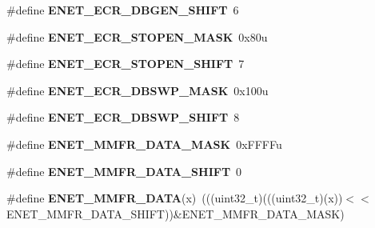 \begin{DoxyCompactItemize}
\item 
\#define {\bfseries E\+N\+E\+T\+\_\+\+E\+C\+R\+\_\+\+D\+B\+G\+E\+N\+\_\+\+S\+H\+I\+FT}~6\hypertarget{group__ENET__Register__Masks_gaf285ad3a1ec1a22c29463f3c5ce55629}{}\label{group__ENET__Register__Masks_gaf285ad3a1ec1a22c29463f3c5ce55629}

\item 
\#define {\bfseries E\+N\+E\+T\+\_\+\+E\+C\+R\+\_\+\+S\+T\+O\+P\+E\+N\+\_\+\+M\+A\+SK}~0x80u\hypertarget{group__ENET__Register__Masks_ga94a800b28e1ec6fbf2e6a237abe50dc6}{}\label{group__ENET__Register__Masks_ga94a800b28e1ec6fbf2e6a237abe50dc6}

\item 
\#define {\bfseries E\+N\+E\+T\+\_\+\+E\+C\+R\+\_\+\+S\+T\+O\+P\+E\+N\+\_\+\+S\+H\+I\+FT}~7\hypertarget{group__ENET__Register__Masks_ga265342bcbd0f282f5fbd894bb7e5191c}{}\label{group__ENET__Register__Masks_ga265342bcbd0f282f5fbd894bb7e5191c}

\item 
\#define {\bfseries E\+N\+E\+T\+\_\+\+E\+C\+R\+\_\+\+D\+B\+S\+W\+P\+\_\+\+M\+A\+SK}~0x100u\hypertarget{group__ENET__Register__Masks_ga1fccd5e705835e6e4232a4a73d66d151}{}\label{group__ENET__Register__Masks_ga1fccd5e705835e6e4232a4a73d66d151}

\item 
\#define {\bfseries E\+N\+E\+T\+\_\+\+E\+C\+R\+\_\+\+D\+B\+S\+W\+P\+\_\+\+S\+H\+I\+FT}~8\hypertarget{group__ENET__Register__Masks_ga62f057092940bf8385c24171c4414f76}{}\label{group__ENET__Register__Masks_ga62f057092940bf8385c24171c4414f76}

\item 
\#define {\bfseries E\+N\+E\+T\+\_\+\+M\+M\+F\+R\+\_\+\+D\+A\+T\+A\+\_\+\+M\+A\+SK}~0x\+F\+F\+F\+Fu\hypertarget{group__ENET__Register__Masks_ga9059e7e576983c3c51723ee135d4e244}{}\label{group__ENET__Register__Masks_ga9059e7e576983c3c51723ee135d4e244}

\item 
\#define {\bfseries E\+N\+E\+T\+\_\+\+M\+M\+F\+R\+\_\+\+D\+A\+T\+A\+\_\+\+S\+H\+I\+FT}~0\hypertarget{group__ENET__Register__Masks_gaa6293f53a8dbb48f6ae13d9ea7717293}{}\label{group__ENET__Register__Masks_gaa6293f53a8dbb48f6ae13d9ea7717293}

\item 
\#define {\bfseries E\+N\+E\+T\+\_\+\+M\+M\+F\+R\+\_\+\+D\+A\+TA}(x)~(((uint32\+\_\+t)(((uint32\+\_\+t)(x))$<$$<$E\+N\+E\+T\+\_\+\+M\+M\+F\+R\+\_\+\+D\+A\+T\+A\+\_\+\+S\+H\+I\+FT))\&E\+N\+E\+T\+\_\+\+M\+M\+F\+R\+\_\+\+D\+A\+T\+A\+\_\+\+M\+A\+SK)\hypertarget{group__ENET__Register__Masks_gab9b153fc08d016ffe1c732b01889f1de}{}\label{group__ENET__Register__Masks_gab9b153fc08d016ffe1c732b01889f1de}


\end{DoxyCompactItemize}

